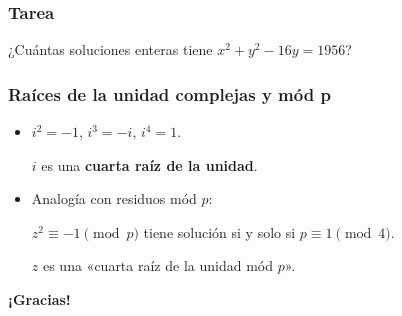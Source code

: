 \documentclass[handout]{beamer}
\begin{document}

\begin{frame}[fragile]
  \frametitle{Tarea}

  \begin{shaded}
    ¿Cuántas soluciones enteras tiene $x^2 + y^2 - 16y = 1956$?
  \end{shaded}
\end{frame}


\begin{frame}[fragile]
  \frametitle{Raíces de la unidad complejas y mód p}

  \begin{itemize}
  \item<2-> $i^2 = -1$, $i^3 = -i$, $i^4 = 1$.

    $i$ es una \textbf{cuarta raíz de la unidad}.
  \end{itemize}


  \begin{itemize}
  \item<4-> Analogía con residuos mód $p$:

    $z^2 \equiv -1 \pmod{p}$ tiene solución si y solo si $p \equiv 1 \pmod{4}$.

    $z$ es una «cuarta raíz de la unidad mód $p$».
  \end{itemize}


\end{frame}


\begin{frame}[fragile]
  \begin{center}
    \LARGE\bf ¡Gracias!
  \end{center}
\end{frame}

\end{document}
